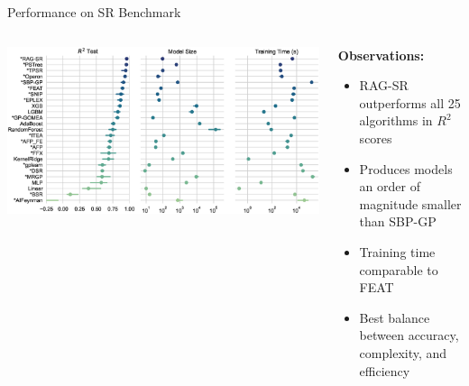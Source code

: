 \documentclass[aspectratio=1610]{beamer}
\begin{document}
    \begin{frame}{Performance on SR Benchmark}
        \begin{columns}
            \begin{column}{0.6\textwidth}
                \begin{center}
                    \includegraphics[width=\textwidth]{figs/pairgrid-pointplot_r2_test_model_size_training-time-(s).eps}
                \end{center}
            \end{column}

            \begin{column}{0.38\textwidth}
                \textbf{Observations:}
                \begin{itemize}
                    \item RAG-SR outperforms all 25 algorithms in $R^2$ scores
                    \item Produces models an order of magnitude smaller than SBP-GP
                    \item Training time comparable to FEAT
                    \item Best balance between accuracy, complexity, and efficiency
                \end{itemize}
            \end{column}
        \end{columns}
    \end{frame}
\end{document}
